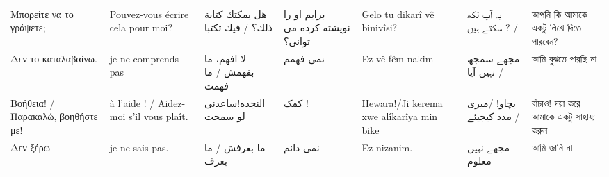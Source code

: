 \begin{longtable}{p{3.5cm} p{3.5cm} p{3.5cm} p{3.5cm} p{3.5cm} p{3.5cm} p{3.5cm} }
 Μπορείτε να το γράψετε;                                                                                                       & Pouvez-vous écrire cela pour moi?                                                               & هل يمكتك كتابة ذلك؟    / فيك تكتبا                                                    & برایم او را نویشته کرده می توانی؟                           & Gelo tu dikarî vê binivîsi?                                                        & یہ  آپ لکھ سکتے ہیں ? /                                                        & আপনি কি আমাকে একটু লিখে দিতে পারবেন?                              \\
 Δεν το καταλαβαίνω.                                                                                                           & je ne comprends pas                                                                             & لا افهم، ما بفهمش                      / ما فهمت                                      & نمی فهمم                                                    & Ez vê fêm nakim                                                                    & مجھے سمجھ  نہیں آیا /                                                          & আমি বুঝতে পারছি না                                                \\
 Βοήθεια! / Παρακαλώ, βοηθήστε με!                                                                                             & à l'aide ! / Aidez-moi s'il vous plaît.                                                         & النجدە!ساعدنی لو سمحت                                                                 & کمک !                                                       & Hewara!/Ji kerema xwe alîkarîya min bike                                           & بچاو! /میری مدد کیجیئے /                                                       & বাঁচাও! দয়া করে আমাকে একটু সাহায্য করুন                           \\
 Δεν ξέρω                                                                                                                      & je ne sais pas.                                                                                 & ما بعرفش        /                ما بعرف                                              & نمی دانم                                                    & Ez nizanim.                                                                        & مجھے نہیں معلوم                                                                & আমি জানি না                                                       \\

\end{longtable}
